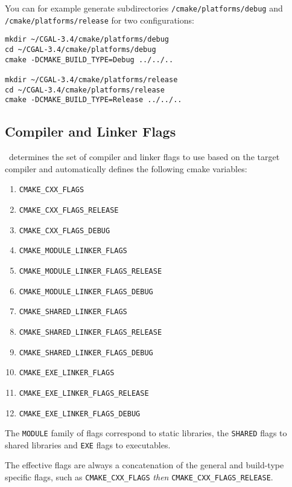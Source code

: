 You can for example generate subdirectories \cgaldir{}\texttt{/cmake/platforms/debug} and 
\cgaldir{}\texttt{/cmake/platforms/release} for two configurations:

{\ccTexHtml{\scriptsize}{}
\begin{verbatim}
mkdir ~/CGAL-3.4/cmake/platforms/debug
cd ~/CGAL-3.4/cmake/platforms/debug
cmake -DCMAKE_BUILD_TYPE=Debug ../../..

mkdir ~/CGAL-3.4/cmake/platforms/release
cd ~/CGAL-3.4/cmake/platforms/release
cmake -DCMAKE_BUILD_TYPE=Release ../../..
\end{verbatim}
}



\subsection{Compiler and Linker Flags}

\cmake\ determines the set of compiler and linker flags to use based on the target compiler and automatically defines
the following cmake variables:

\begin{enumerate}
\item \texttt{CMAKE\_CXX\_FLAGS}
\item \texttt{CMAKE\_CXX\_FLAGS\_RELEASE}
\item \texttt{CMAKE\_CXX\_FLAGS\_DEBUG}
\item \texttt{CMAKE\_MODULE\_LINKER\_FLAGS}
\item \texttt{CMAKE\_MODULE\_LINKER\_FLAGS\_RELEASE}
\item \texttt{CMAKE\_MODULE\_LINKER\_FLAGS\_DEBUG}
\item \texttt{CMAKE\_SHARED\_LINKER\_FLAGS}
\item \texttt{CMAKE\_SHARED\_LINKER\_FLAGS\_RELEASE}
\item \texttt{CMAKE\_SHARED\_LINKER\_FLAGS\_DEBUG}
\item \texttt{CMAKE\_EXE\_LINKER\_FLAGS}
\item \texttt{CMAKE\_EXE\_LINKER\_FLAGS\_RELEASE}
\item \texttt{CMAKE\_EXE\_LINKER\_FLAGS\_DEBUG}
 \end{enumerate}

The \texttt{MODULE} family of flags correspond to static libraries, the \texttt{SHARED} flags to shared libraries
and \texttt{EXE} flags to executables.

The effective flags are always a concatenation of the general and build-type specific flags, such as
\texttt{CMAKE\_CXX\_FLAGS} {\em then} \texttt{CMAKE\_CXX\_FLAGS\_RELEASE}.


